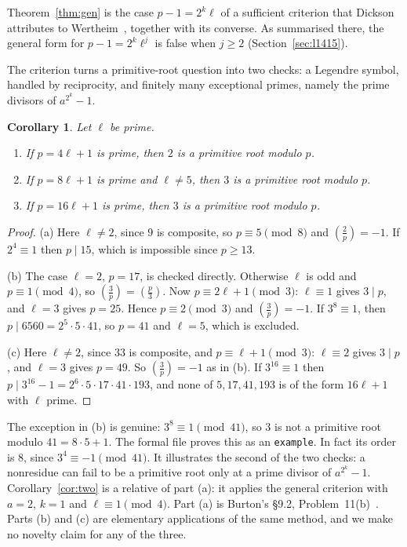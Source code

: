 \documentclass[11pt]{article}
\newtheorem{corollary}[theorem]{Corollary}
\theoremstyle{remark}
\newcommand{\leg}[2]{\left(\frac{#1}{#2}\right)}
\newcommand{\lean}[1]{\texttt{#1}}
\begin{document}
Theorem~\ref{thm:gen} is the case $p-1=2^k\ell$ of a sufficient criterion that Dickson attributes to
Wertheim~\cite[Vol.~I, p.~196]{Dickson}, together with its converse. As summarised there, the general
form for $p-1=2^k\ell^j$ is false when $j\geq2$ (Section~\ref{sec:l1415}).

The criterion turns a primitive-root question into two checks: a Legendre symbol, handled by
reciprocity, and finitely many exceptional primes, namely the prime divisors of $a^{2^k}-1$.

\begin{corollary}\label{cor:fam}
Let $\ell$ be prime.
\begin{enumerate}
\item[(a)] If $p=4\ell+1$ is prime, then $2$ is a primitive root modulo $p$.
\item[(b)] If $p=8\ell+1$ is prime and $\ell\neq 5$, then $3$ is a primitive root modulo $p$.
\item[(c)] If $p=16\ell+1$ is prime, then $3$ is a primitive root modulo $p$.
\end{enumerate}
\end{corollary}
\begin{proof}
(a) Here $\ell\neq 2$, since $9$ is composite, so $p\equiv 5\pmod 8$ and $\leg{2}{p}=-1$. If
$2^4\equiv1$ then $p\mid 15$, which is impossible since $p\geq 13$.

(b) The case $\ell=2$, $p=17$, is checked directly. Otherwise $\ell$ is odd and
$p\equiv 1\pmod 4$, so $\leg{3}{p}=\leg{p}{3}$. Now $p\equiv 2\ell+1\pmod 3$: $\ell\equiv1$
gives $3\mid p$, and $\ell=3$ gives $p=25$. Hence $p\equiv 2\pmod 3$ and $\leg{3}{p}=-1$.
If $3^8\equiv 1$, then $p\mid 6560=2^5\cdot5\cdot41$, so $p=41$ and $\ell=5$, which is excluded.

(c) Here $\ell\neq 2$, since $33$ is composite, and $p\equiv \ell+1\pmod 3$: $\ell\equiv 2$ gives
$3\mid p$, and $\ell=3$ gives $p=49$. So $\leg{3}{p}=-1$ as in (b). If $3^{16}\equiv1$ then
$p\mid 3^{16}-1=2^6\cdot5\cdot17\cdot41\cdot193$, and none of $5,17,41,193$ is of the form
$16\ell+1$ with $\ell$ prime.
\end{proof}

The exception in (b) is genuine: $3^8\equiv1\pmod{41}$, so $3$ is not a primitive root modulo
$41=8\cdot5+1$. The formal file proves this as an \lean{example}. In fact its order is $8$,
since $3^4\equiv-1\pmod{41}$. It illustrates the second of
the two checks: a nonresidue can fail to be a primitive root only at a prime divisor of
$a^{2^k}-1$. Corollary~\ref{cor:two} is a relative of part (a): it applies the general criterion with
$a=2$, $k=1$ and $\ell\equiv1\pmod 4$. Part (a) is Burton's \S9.2, Problem~11(b)~\cite{Burton}.
Parts (b) and (c) are elementary applications of the same method, and we make no novelty
claim for any of the three.
\end{document}
